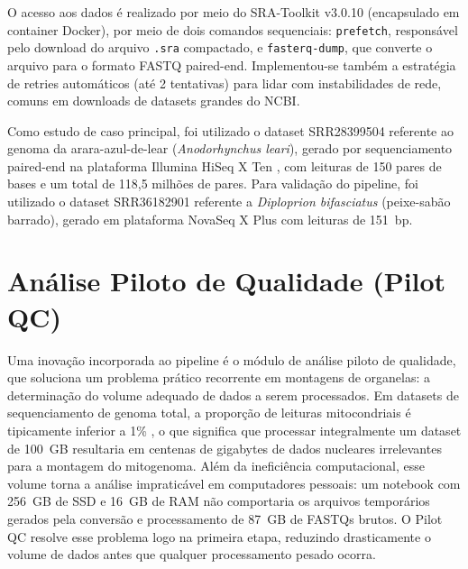 O acesso aos dados é realizado por meio do SRA-Toolkit v3.0.10 (encapsulado em container Docker), por meio de dois comandos sequenciais: \texttt{prefetch}, responsável pelo download do arquivo \texttt{.sra} compactado, e \texttt{fasterq-dump}, que converte o arquivo para o formato FASTQ paired-end. Implementou-se também a estratégia de retries automáticos (até 2 tentativas) para lidar com instabilidades de rede, comuns em downloads de datasets grandes do NCBI.

Como estudo de caso principal, foi utilizado o dataset SRR28399504 referente ao genoma da arara-azul-de-lear (\textit{Anodorhynchus leari}), gerado por sequenciamento paired-end na plataforma Illumina HiSeq X Ten \cite{iridian2024}, com leituras de 150 pares de bases e um total de 118,5 milhões de pares. Para validação do pipeline, foi utilizado o dataset SRR36182901 referente a \textit{Diploprion bifasciatus} (peixe-sabão barrado), gerado em plataforma NovaSeq X Plus com leituras de 151~bp.

\section{Análise Piloto de Qualidade (Pilot QC)}
\label{sec:pilotqc}

Uma inovação incorporada ao pipeline é o módulo de análise piloto de qualidade, que soluciona um problema prático recorrente em montagens de organelas: a determinação do volume adequado de dados a serem processados. Em datasets de sequenciamento de genoma total, a proporção de leituras mitocondriais é tipicamente inferior a 1\% \cite{dierckxsens2017}, o que significa que processar integralmente um dataset de 100~GB resultaria em centenas de gigabytes de dados nucleares irrelevantes para a montagem do mitogenoma. Além da ineficiência computacional, esse volume torna a análise impraticável em computadores pessoais: um notebook com 256~GB de SSD e 16~GB de RAM não comportaria os arquivos temporários gerados pela conversão e processamento de 87~GB de FASTQs brutos. O Pilot QC resolve esse problema logo na primeira etapa, reduzindo drasticamente o volume de dados antes que qualquer processamento pesado ocorra.

